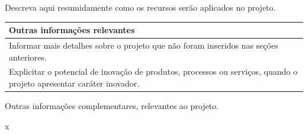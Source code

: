 \documentclass[
  12pt,				
  openright,	
  twoside,	
  a4paper,
  brazil,	
  oldfontcommands,
  ]{abntex2}
\begin{document}
Descreva aqui resumidamente como os recursos serão aplicados no projeto.


\begin{table}[H]
\begin{center}
\begin{tabularx}{\textwidth}{|X|}
\hline
\cellcolor{green} {\bf Outras informa\c{c}\~{o}es relevantes}\\\hline
\multicolumn{1}{l}{\footnotesize \color{red} Informar mais detalhes sobre o projeto que n\~{a}o foram inseridos nas se\c{c}\~{o}es anteriores.} \\
\multicolumn{1}{l}{\footnotesize \color{red} Explicitar o potencial de inova\c{c}\~{a}o de produtos, processos ou servi\c{c}os, quando o projeto apresentar car\'{a}ter inovador.} \\
\end{tabularx}
\end{center}
\end{table}
\vspace{-10mm}

Outras informações complementares, relevantes ao projeto.


{\color{white}x}

\label{DocLastPage}
\end{document}
